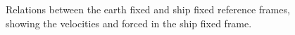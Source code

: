 \begin{figure}[h]
    \centering
    
    \caption{Relations between the earth fixed and ship fixed reference frames, showing the velocities and forced in the ship fixed frame.}
    \label{fig:reference_frames}
\end{figure}